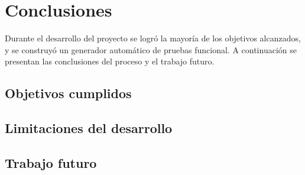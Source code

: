 %
\chapter{Conclusiones}
\label{chapter5}

Durante el desarrollo del proyecto se logró la mayoría de los objetivos alcanzados, y se construyó un generador automático de pruebas funcional. A continuación se presentan las conclusiones del proceso y el trabajo futuro.

\section{Objetivos cumplidos}

\section{Limitaciones del desarrollo}

\section{Trabajo futuro}
